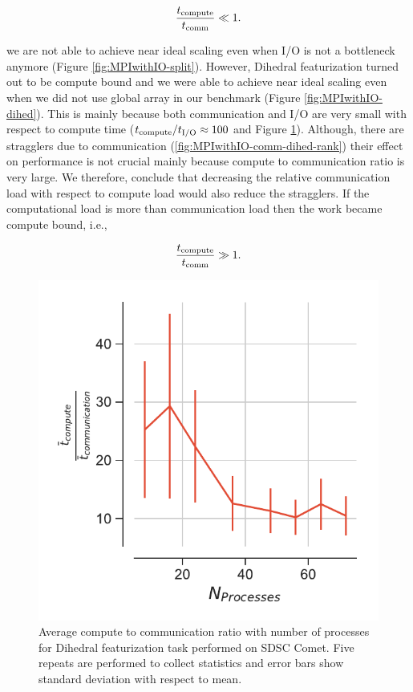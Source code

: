 \begin{gather*}
  \frac{{t}_{\text{compute}}}{t_{\text{comm}}} \ll 1.
\end{gather*}

we are not able to achieve near ideal scaling even when I/O is not a bottleneck anymore (Figure \ref{fig:MPIwithIO-split}).
However, Dihedral featurization turned out to be compute bound and we were able to achieve near ideal scaling even when we did not use global array in our benchmark (Figure \ref{fig:MPIwithIO-dihed}).
This is mainly because both communication and I/O are very small with respect to compute time (${t}_{\text{compute}}/{t}_{\text{I/O}} \approx 100$ and Figure \ref{fig:tcomp_tcomm_ratio_dihed}). 
Although, there are stragglers due to communication (\ref{fig:MPIwithIO-comm-dihed-rank}) their effect on performance is not crucial mainly because compute to communication ratio is very large. 
We therefore, conclude that decreasing the relative communication load with respect to compute load would also reduce the stragglers. 
If the computational load is more than communication load then the work became compute bound, i.e.,

\begin{gather*}
  \frac{{t}_{\text{compute}}}{t_{\text{comm}}} \gg 1.
\end{gather*}

\begin{figure}[ht!]
\centering
  \includegraphics[width=0.4\linewidth]{figures/tcomp_tcomm_ratio_dihed.pdf}
\caption{Average compute to communication ratio with number of processes for Dihedral featurization task performed on SDSC Comet.
Five repeats are performed to collect statistics and error bars show standard deviation with respect to mean.}
\label{fig:tcomp_tcomm_ratio_dihed}
\end{figure}


